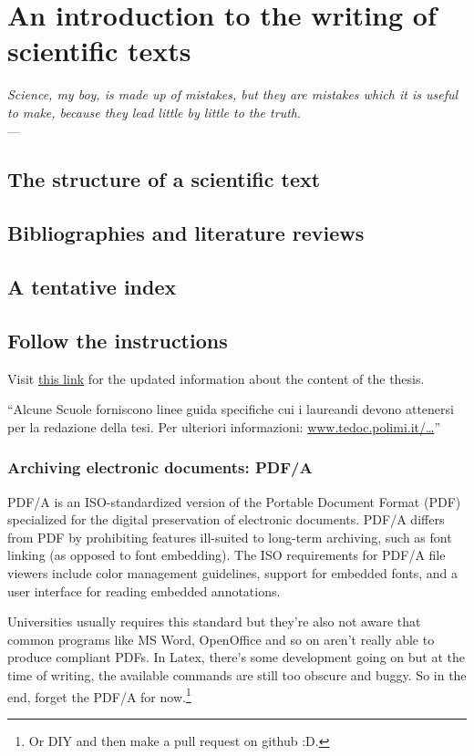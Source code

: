 \chapter{An introduction to the writing of scientific texts}
\label{chap:aChapter}
\begin{flushright}{\slshape    
   Science, my boy, is made up of mistakes, but they are mistakes
   which it is useful to make, because they lead little by little
   to the truth}. \\ \medskip --- \citeauthor{verne_journey:1957}
\end{flushright} 

\section{The structure of a scientific text}

\section{Bibliographies and literature reviews}

\section{A tentative index}

\section{Follow the instructions}
Visit \href{http://www.tedoc.polimi.it/tesilaurea/Consegna-tesi-di-laurea-(vecchio-ordinamento-e-specialistica)}{this link} for the updated information about the content of the thesis.

\enquote{Alcune Scuole forniscono linee guida specifiche cui i laureandi devono attenersi per la redazione della tesi. Per ulteriori informazioni:
\href{http://www.tedoc.polimi.it/download/lauree_magistrali/201406_POLITesi_Info_specifiche_scuole.pdf}{www.tedoc.polimi.it/\ldots}}

\subsection{Archiving electronic documents: PDF/A}
PDF/A is an ISO-standardized version of the Portable Document Format (PDF) specialized for the digital preservation of electronic documents. PDF/A differs from PDF by prohibiting features ill-suited to long-term archiving, such as font linking (as opposed to font embedding). The ISO requirements for PDF/A file viewers include color management guidelines, support for embedded fonts, and a user interface for reading embedded annotations.

Universities usually requires this standard but they're also not aware that common programs like MS Word, OpenOffice and so on aren't really able to produce compliant PDFs. In Latex, there's some development going on but at the time of writing, the available commands are still too obscure and buggy. So in the end, forget the PDF/A for now.\footnote{Or DIY and then make a pull request on github :D.}